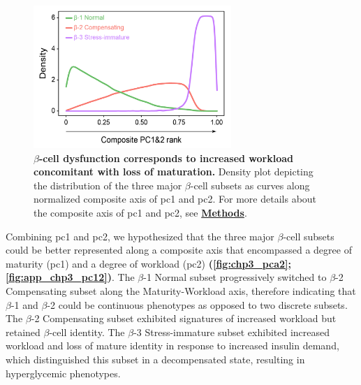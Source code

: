


\begin{figure}
\includegraphics[width=7.5cm]{Chapter5/Fig/F3-6-04.png}
\caption[$\beta$-cell dysfunction corresponds to increased workload concomitant with loss of maturation]{\textbf{$\beta$-cell dysfunction corresponds to increased workload concomitant with loss of maturation.}  Density plot depicting the distribution of the three major $\beta$-cell subsets as curves along normalized composite axis of \gls{pc}1 and \gls{pc}2. For more details about the composite axis of \gls{pc}1 and \gls{pc}2, see \hyperref[sec:chp3_methods]{\textbf{Methods}}.}
\label{fig:chp3_pca2}
\vspace{2cm}
\end{figure}

\par Combining \gls{pc}1 and \gls{pc}2, we hypothesized that the three major $\beta$-cell subsets could be better represented along a composite axis that encompassed a degree of maturity (\gls{pc}1) and a degree of workload (\gls{pc}2) \textbf{(\autoref{fig:chp3_pca2}; \autoref{fig:app_chp3_pc12})}. The $\beta$-1 Normal subset progressively switched to $\beta$-2 Compensating subset along the Maturity-Workload axis, therefore indicating that $\beta$-1 and $\beta$-2 could be continuous phenotypes as opposed to two discrete subsets. The $\beta$-2 Compensating subset exhibited signatures of increased workload but retained $\beta$-cell identity. The $\beta$-3 Stress-immature subset exhibited increased workload and loss of mature identity in response to increased insulin demand, which distinguished this subset in a decompensated state, resulting in hyperglycemic phenotypes.\\

